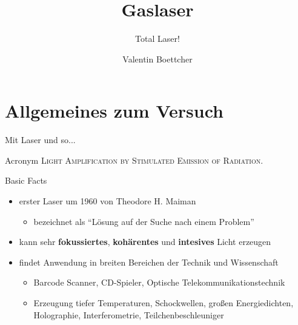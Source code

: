 \documentclass[10pt, aspectratio=169]{beamer}
\title{Gaslaser}
\subtitle{Total Laser!}
\author{Valentin Boettcher}
\begin{document}
\hypersetup{pageanchor=false}
\maketitle

\hypersetup{pageanchor=true}
\begin{frame}
  \tableofcontents
\end{frame}

\section{Allgemeines zum Versuch}

\begin{frame}{Mit Laser und so...}
  \begin{block}{Acronym}
    \textsc{Light Amplification by Stimulated Emission of Radiation.}
  \end{block}

  \pause

  \begin{block}{Basic Facts}
    \pause
    \begin{itemize}
    \item erster Laser um 1960 von Theodore H. Maiman
      \begin{itemize}
      \item bezeichnet als ``L\"osung auf der Suche nach einem
        Problem''~\cite{2010}
      \end{itemize}
      \pause
    \item kann sehr \textbf{fokussiertes}, \textbf{koh\"arentes} und
      \textbf{intesives} Licht erzeugen \pause
    \item findet Anwendung in breiten Bereichen der Technik und
      Wissenschaft
      \begin{itemize}
      \item Barcode Scanner, CD-Spieler, Optische
        Telekommunikationstechnik \pause
      \item Erzeugung tiefer Temperaturen, Schockwellen, gro\ss{}en
        Energiedichten, Holographie, Interferometrie,
        Teilchenbeschleuniger
      \end{itemize}
    \end{itemize}
  \end{block}
\end{frame}
\end{document}
